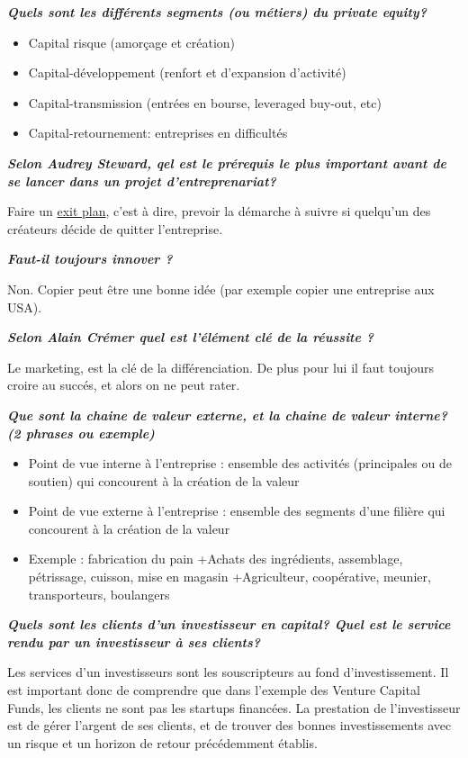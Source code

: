 \documentclass[12pt,oneside,a4paper]{article}
\begin{document}
\textbf{\emph{Quels sont les différents segments (ou métiers) du private equity?}}

\begin{itemize}[label=]
	\item Capital risque (amorçage et création)
    \item Capital-développement (renfort et d'expansion d'activité)
    \item Capital-transmission (entrées en bourse, leveraged buy-out, etc)
    \item Capital-retournement: entreprises en difficultés
\end{itemize}


\textbf{\emph{Selon Audrey Steward, qel est le prérequis le plus important avant de se lancer dans un projet d'entreprenariat?}}

Faire un \underline{exit plan}, c'est à dire, prevoir la démarche à suivre si quelqu'un des créateurs décide de quitter l'entreprise.

\textbf{\emph{Faut-il toujours innover ?}}

Non. Copier peut être une bonne idée (par exemple copier une entreprise aux USA).

\textbf{\emph{Selon Alain Crémer quel est l'élément clé de la réussite ?}}

Le marketing, est la clé de la différenciation. De plus pour lui il faut toujours croire au succés, et alors on ne peut rater. 



\textbf{\emph{Que sont la chaine de valeur externe, et la chaine de valeur interne? (2 phrases ou exemple)}}

\begin{itemize}
    \item Point de vue interne à l’entreprise : ensemble des activités (principales ou de soutien) qui concourent à la création de la valeur
    \item Point de vue externe à l’entreprise : ensemble des segments d’une filière qui concourent à la création de la  valeur
    \item Exemple : fabrication du pain
        \subitem +Achats des ingrédients, assemblage, pétrissage, cuisson, mise en magasin
        \subitem +Agriculteur, coopérative, meunier, transporteurs, boulangers
\end{itemize}

\textbf{\emph{Quels sont les clients d'un investisseur en capital? Quel est le service rendu par un investisseur à ses clients?}}

Les services d'un investisseurs sont les souscripteurs au fond d'investissement. Il est important donc de comprendre que dans l'exemple des Venture Capital Funds, les clients ne sont pas les startups financées.
La prestation de l'investisseur est de gérer l'argent de ses clients, et de trouver des bonnes investissements avec un risque et un horizon de retour précédemment établis.
\end{document}
